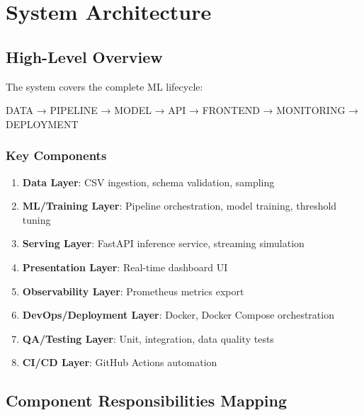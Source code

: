 \documentclass[12pt,a4paper]{article}
\begin{document}
\section{System Architecture}

\subsection{High-Level Overview}

The system covers the complete ML lifecycle:
\begin{center}
DATA → PIPELINE → MODEL → API → FRONTEND → MONITORING → DEPLOYMENT
\end{center}

\subsubsection{Key Components}
\begin{enumerate}
    \item \textbf{Data Layer}: CSV ingestion, schema validation, sampling
    \item \textbf{ML/Training Layer}: Pipeline orchestration, model training, threshold tuning
    \item \textbf{Serving Layer}: FastAPI inference service, streaming simulation
    \item \textbf{Presentation Layer}: Real-time dashboard UI
    \item \textbf{Observability Layer}: Prometheus metrics export
    \item \textbf{DevOps/Deployment Layer}: Docker, Docker Compose orchestration
    \item \textbf{QA/Testing Layer}: Unit, integration, data quality tests
    \item \textbf{CI/CD Layer}: GitHub Actions automation
\end{enumerate}

\subsection{Component Responsibilities Mapping}
\end{document}
